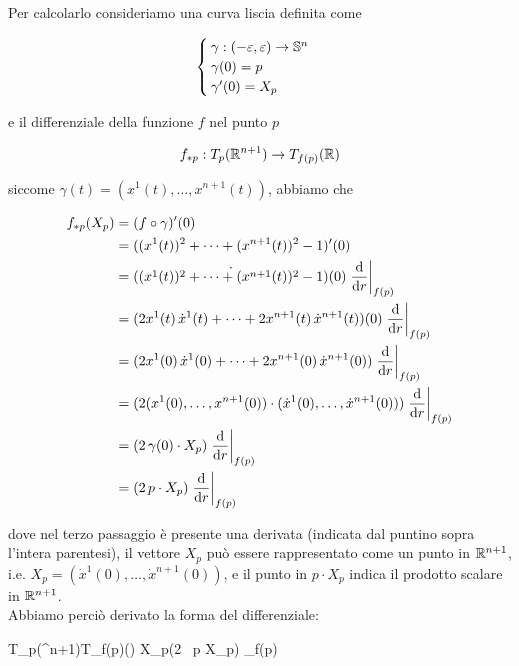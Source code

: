 Per calcolarlo consideriamo una curva liscia definita come

\begin{equation}
	\begin{cases}
		\gamma : (-\varepsilon,\varepsilon) \to \S^{n} \\
		\gamma(0) = p \\
		\gamma'(0) = X_{p}
	\end{cases}
\end{equation}

e il differenziale della funzione $ f $ nel punto $ p $

\begin{equation}
	f_{*p} : T_{p}(\R^{n+1}) \to T_{f(p)}(\R)
\end{equation}

siccome $ \gamma(t) = (x^{1}(t),\dots,x^{n+1}(t)) $, abbiamo che

\begin{align}
	\begin{split}
		f_{*p}(X_{p}) &= (f \circ \gamma)'(0) \\
		&= ((x^{1}(t))^{2} + \cdots + (x^{n+1}(t))^{2} - 1)'(0) \\
		&= \dot{((x^{1}(t))^{2} + \cdots + (x^{n+1}(t))^{2} - 1)}(0) \eval{ \dv{r} }_{f(p)} \\
		&= (2 x^{1}(t) \, \dot{x}^{1}(t) + \cdots + 2 x^{n+1}(t) \, \dot{x}^{n+1}(t))(0) \eval{ \dv{r} }_{f(p)} \\
		&= (2 x^{1}(0) \, \dot{x}^{1}(0) + \cdots + 2 x^{n+1}(0) \, \dot{x}^{n+1}(0)) \eval{ \dv{r} }_{f(p)} \\
		&= (2 (x^{1}(0), \dots, x^{n+1}(0)) \cdot (\dot{x}^{1}(0), \dots, \dot{x}^{n+1}(0))) \eval{ \dv{r} }_{f(p)} \\
		&= (2 \, \gamma(0) \cdot X_{p}) \eval{ \dv{r} }_{f(p)} \\
		&= (2 \, p \cdot X_{p}) \eval{ \dv{r} }_{f(p)}
	\end{split}
\end{align}

dove nel terzo passaggio è presente una derivata (indicata dal puntino sopra l'intera parentesi), il vettore $ X_{p} $ può essere rappresentato come un punto in $ \R^{n+1} $, i.e. $ X_{p} = (\dot{x}^{1}(0),\dots,\dot{x}^{n+1}(0)) $, e il punto in $ p \cdot X_{p} $ indica il prodotto scalare in $ \R^{n+1} $. \\
Abbiamo perciò derivato la forma del differenziale:

	{T_{p}(\R^{n+1})}{T_{f(p)}(\R)}
	{X_{p}}{(2 \, p \cdot X_{p}) _{f(p)}}
	
